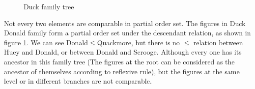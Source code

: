 \documentclass{article}
\begin{document}
\begin{figure}[htbp]
\centering
{}
\caption{Duck family tree}
\label{fig:genealogical-tree}
\end{figure}

Not every two elements are comparable in partial order set. The figures in Duck Donald family form a partial order set under the descendant relation, as shown in figure \ref{fig:genealogical-tree}. We can see Donald$\leq$Quackmore, but there is no $\leq$ relation between Huey and Donald, or between Donald and Scrooge. Although every one has its ancestor in this family tree (The figures at the root can be considered as the ancestor of themselves according to reflexive rule), but the figures at the same level or in different branches are not comparable.
\end{document}
